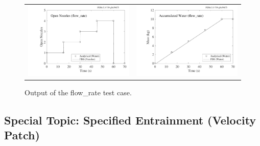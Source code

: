 \documentclass[11pt]{book}
\begin{document}
\begin{figure}[ht]
\begin{tabular*}{\textwidth}{lr}
\includegraphics[width=3.2in]{SCRIPT_FIGURES/flow_rate_open_nozzles} &
\includegraphics[width=3.2in]{SCRIPT_FIGURES/flow_rate_water_mass}
\end{tabular*}
\caption[Results of the {\ct flow\_rate} test case]{Output of the {\ct flow\_rate} test case.}
\label{flow_rate}
\end{figure}

\subsection{Special Topic: Specified Entrainment (Velocity Patch)}
\label{info:velocity_patch}
\end{document}
